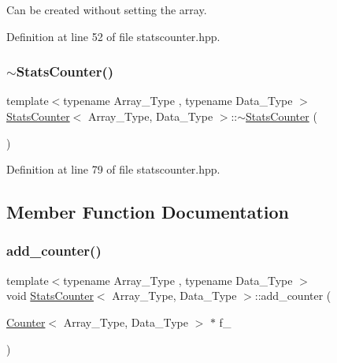 Can be created without setting the array. 



Definition at line 52 of file statscounter.\+hpp.

\mbox{\label{class_stats_counter_a2824d86765d94e909e4b33396250b6c7}} 
\subsubsection{\texorpdfstring{$\sim$\+Stats\+Counter()}{~StatsCounter()}}
{\footnotesize\ttfamily template$<$typename Array\+\_\+\+Type , typename Data\+\_\+\+Type $>$ \\
\hyperlink{class_stats_counter}{Stats\+Counter}$<$ Array\+\_\+\+Type, Data\+\_\+\+Type $>$\+::$\sim$\hyperlink{class_stats_counter}{Stats\+Counter} (\begin{DoxyParamCaption}{ }\end{DoxyParamCaption})\hspace{0.3cm}{\ttfamily [inline]}}



Definition at line 79 of file statscounter.\+hpp.



\subsection{Member Function Documentation}
\mbox{\label{class_stats_counter_a829e41243a7b18cf71337deeec9f7030}} 
\subsubsection{\texorpdfstring{add\+\_\+counter()}{add\_counter()}\hspace{0.1cm}{\footnotesize\ttfamily [1/2]}}
{\footnotesize\ttfamily template$<$typename Array\+\_\+\+Type , typename Data\+\_\+\+Type $>$ \\
void \hyperlink{class_stats_counter}{Stats\+Counter}$<$ Array\+\_\+\+Type, Data\+\_\+\+Type $>$\+::add\+\_\+counter (\begin{DoxyParamCaption}\item[{\hyperlink{class_counter}{Counter}$<$ Array\+\_\+\+Type, Data\+\_\+\+Type $>$ $\ast$}]{f\+\_\+ }\end{DoxyParamCaption})\hspace{0.3cm}{\ttfamily [inline]}}



